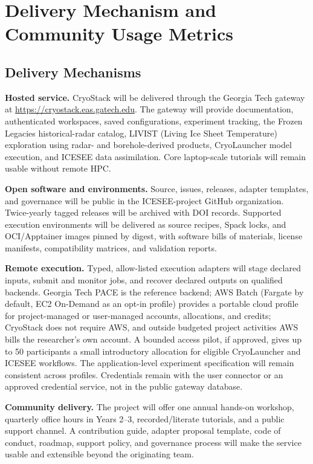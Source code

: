 \section*{Delivery Mechanism and Community Usage Metrics}

\subsection*{Delivery Mechanisms}

\textbf{Hosted service.} CryoStack will be delivered through the Georgia Tech
gateway at \url{https://cryostack.eas.gatech.edu}. The gateway will provide
documentation, authenticated workspaces, saved configurations, experiment tracking, the
Frozen Legacies historical-radar catalog, LIVIST
(Living Ice Sheet Temperature) exploration using radar- and borehole-derived
products, CryoLauncher model execution, and ICESEE data assimilation.
Core laptop-scale tutorials will remain usable without remote HPC.

\textbf{Open software and environments.} Source, issues, releases, adapter
templates, and governance will be public in the ICESEE-project GitHub
organization. Twice-yearly tagged releases will be archived with DOI records.
Supported execution environments will be delivered as source recipes, Spack
locks, and OCI/Apptainer images pinned by digest, with software bills of
materials, license manifests, compatibility matrices, and validation reports.

\textbf{Remote execution.} Typed, allow-listed execution adapters will stage
declared inputs, submit and monitor jobs, and recover declared outputs on
qualified backends. Georgia Tech PACE is the reference backend; AWS Batch (Fargate by default,
EC2 On-Demand as an opt-in profile) provides a portable cloud profile for
project-managed or user-managed accounts, allocations, and credits; CryoStack
does not require AWS, and outside budgeted project activities AWS bills the
researcher's own account. A bounded access pilot, if approved, gives up to 50
participants a small introductory allocation for eligible CryoLauncher and
ICESEE workflows. The application-level experiment specification
will remain consistent across profiles. Credentials remain with the user
connector or an approved credential service, not in the public gateway
database.

\textbf{Community delivery.} The project will offer one annual hands-on
workshop, quarterly office hours in Years 2--3, recorded/literate tutorials,
and a public support channel. A contribution guide, adapter proposal template,
code of conduct, roadmap, support policy, and governance process will make the
service usable and extensible beyond the originating team.

